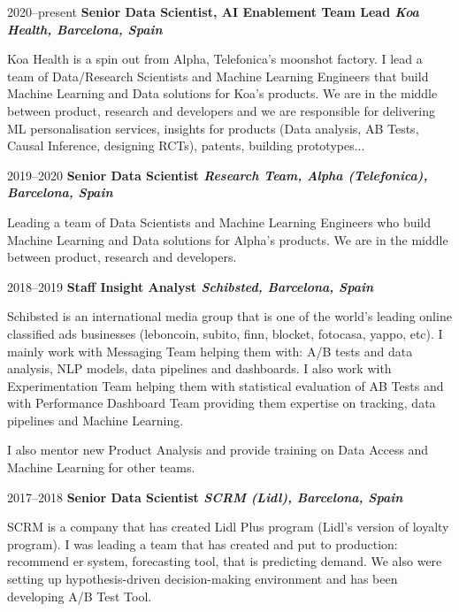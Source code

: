 \documentclass{article}
\begin{document}
\begin{CV}


  \item[2020--present] {\bf Senior Data Scientist, AI Enablement Team Lead \it Koa Health, Barcelona, Spain}

  Koa Health is a spin out from Alpha,
  Telefonica's moonshot factory. I lead a team of Data/Research Scientists and
  Machine Learning Engineers that build Machine Learning and Data solutions for
  Koa's products. We are in the middle between product, research and developers
  and we are responsible for delivering ML personalisation services, insights
  for products (Data analysis, AB Tests, Causal Inference, designing RCTs),
  patents, building prototypes...

\item[2019--2020] {\bf Senior Data Scientist \it Research Team, Alpha (Telefonica), Barcelona, Spain}

  Leading a team of Data Scientists and Machine Learning Engineers who build Machine Learning and Data solutions for Alpha's products. We are in the middle between product, research and developers.
  

\item[2018--2019] {\bf Staff Insight Analyst \it Schibsted, Barcelona, Spain}
  
  Schibsted is an international media group that is one of the world’s leading online classified ads
  businesses (leboncoin, subito, finn, blocket, fotocasa, yappo, etc). I mainly work with Messaging
  Team helping them with: A/B tests and data analysis, NLP models, data pipelines and dashboards.  I
  also work with Experimentation Team helping them with statistical evaluation of AB Tests and with
  Performance Dashboard Team providing them expertise on tracking, data pipelines and Machine
  Learning.

  I also mentor new Product Analysis and provide training on Data Access and Machine Learning for
  other teams.
  
\item[2017--2018] {\bf Senior Data Scientist \it SCRM (Lidl), Barcelona, Spain}

  SCRM is a company that has created Lidl Plus program (Lidl's version of loyalty program). I was
  leading a team that has created and put to production: recommend er system, forecasting tool,
  that is predicting demand.  We also were setting up hypothesis-driven decision-making environment
  and has been developing A/B Test Tool.


\end{CV}
\end{document}
